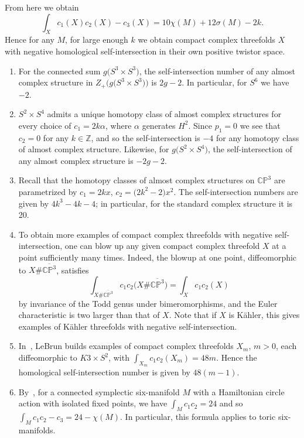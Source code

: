 \documentclass[pdftex]{sigma}%
\newcommand{\CP}{\mathbb{CP}}
\newcommand{\Z}{\mathbb{Z}}
\numberwithin{equation}{section}
\begin{document}
\begin{Example}
\begin{enumerate}
From here we obtain \[\int_X c_1(X)c_2(X) - c_3(X) = 10\chi(M) + 12\sigma(M) - 2k.\] Hence for any $M$, for large enough $k$ we obtain compact complex threefolds $X$ with negative homological self-intersection in their own positive twistor space.
\end{enumerate}
\end{Example}

\begin{Example}\label{exampleselfintersection}\quad
\begin{enumerate}\itemsep=0pt
\item For the connected sum $g\big(S^3 \times S^3\big)$, the self-intersection number of any almost complex structure in $Z_+\big(g\big(S^3 \times S^3\big)\big)$ is $2g-2$. In particular, for $S^6$ we have $-2$.
\item $S^2 \times S^4$ admits a unique homotopy class of almost complex structures for every choice of $c_1 = 2k\alpha$, where $\alpha$ generates $H^2$. Since $p_1 = 0$ we see that $c_2 = 0$ for any $k \in \Z$, and so the self-intersection is $-4$ for any homotopy class of almost complex structure. Likewise, for $g\big( S^2 \times S^4 \big)$, the self-intersection of any almost complex structure is $-2g-2$.
\item Recall that the homotopy classes of almost complex structures on $\mathbb{CP}^3$ are parametrized by $c_1 = 2kx$, $c_2 = \big(2k^2-2\big)x^2$. The self-intersection numbers are given by $4k^3 - 4k - 4$; in particular, for the standard complex structure it is 20.

\item To obtain more examples of compact complex threefolds with negative self-intersection, one can blow up any given compact complex threefold $X$ at a point sufficiently many times. Indeed, the blowup at one point, diffeomorphic to $X \# \overline{\CP^3}$, satisfies
\[ \int_{X \# \overline{\CP^3}} c_1c_2\big(X \# \overline{\CP^3}\big) = \int_X c_1c_2(X)\] by invariance of the Todd genus under bimeromorphisms, and the Euler characteristic is two larger than that of $X$. Note that if $X$ is K\"ahler, this gives examples of K\"ahler threefolds with negative self-intersection.
\item In~\cite{Le99}, LeBrun builds examples of compact complex threefolds $X_m$, $m>0$, each diffeomorphic to $K3\times S^2$, with $\int_{X_m} c_1c_2(X_m) = 48m$. Hence the homological self-intersection number is given by $48(m-1)$.
\item By~\cite[Corollary 3.1]{GS14}, for a connected symplectic six-manifold $M$ with a Hamiltonian circle action with isolated fixed points, we have $\int_M c_1c_2 = 24$ and so $\int_M c_1c_2 - c_3 = 24-\chi(M)$. In particular, this formula applies to toric six-manifolds.

\end{enumerate} \end{Example}
\end{document}
